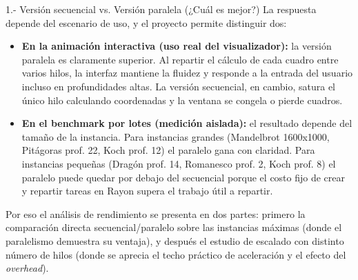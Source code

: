 \begin{respuesta}{1.- Versión secuencial vs. Versión paralela (¿Cuál es mejor?)}
    La respuesta depende del escenario de uso, y el proyecto permite distinguir dos:

    \begin{itemize}
        \item \textbf{En la animación interactiva (uso real del visualizador):} la versión paralela es claramente superior. Al repartir el cálculo de cada cuadro entre varios hilos, la interfaz mantiene la fluidez y responde a la entrada del usuario incluso en profundidades altas. La versión secuencial, en cambio, satura el único hilo calculando coordenadas y la ventana se congela o pierde cuadros.

        \item \textbf{En el benchmark por lotes (medición aislada):} el resultado depende del tamaño de la instancia. Para instancias grandes (Mandelbrot 1600x1000, Pitágoras prof. 22, Koch prof. 12) el paralelo gana con claridad. Para instancias pequeñas (Dragón prof. 14, Romanesco prof. 2, Koch prof. 8) el paralelo puede quedar por debajo del secuencial porque el costo fijo de crear y repartir tareas en Rayon supera el trabajo útil a repartir.
    \end{itemize}

    Por eso el análisis de rendimiento se presenta en dos partes: primero la comparación directa secuencial/paralelo sobre las instancias máximas (donde el paralelismo demuestra su ventaja), y después el estudio de escalado con distinto número de hilos (donde se aprecia el techo práctico de aceleración y el efecto del \textit{overhead}).
\end{respuesta}
